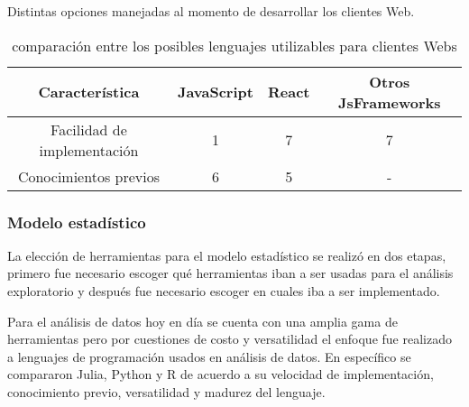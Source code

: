     \begin{table}[ht]
        \caption[Comparativa de posibles lenguajes nivel cliente Web]{comparación entre
        los posibles lenguajes utilizables para clientes Webs}
        \label{tab:LenguajesCliente}
        \begin{center}
            Distintas opciones manejadas al momento de desarrollar los clientes Web.\\

            \vspace{0.3cm}
            \begin{tabular}{|c|c|c|c|}
                \hline
                Característica              & JavaScript & React & Otros JsFrameworks\\\hline
                Facilidad de implementación & 1         & 7     &  7\\\hline
                Conocimientos previos       & 6         & 5     &  - \\\hline
            \end{tabular}
        \end{center}
    \end{table}



    \subsubsection{Modelo estadístico}
    La elección de herramientas para el modelo estadístico se realizó en dos
    etapas, primero fue necesario escoger qué herramientas iban a ser usadas
    para el análisis exploratorio y después fue necesario escoger en cuales iba
    a ser implementado.

    Para el análisis de datos hoy en día se cuenta con una amplia gama de
    herramientas pero por cuestiones de costo y versatilidad el enfoque fue
    realizado a lenguajes de programación usados en análisis de datos. En
    específico se compararon Julia, Python y R de acuerdo a su velocidad de
    implementación, conocimiento previo, versatilidad y madurez del lenguaje.

